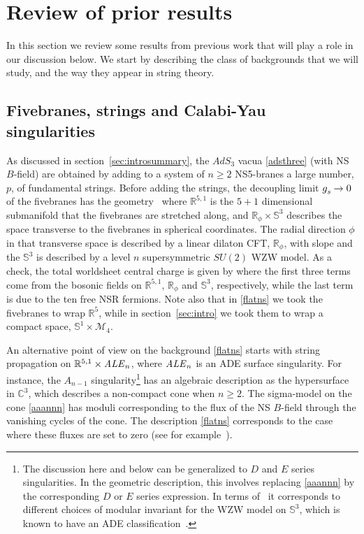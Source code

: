 \documentclass[12pt]{article}
\def\gstr{g_{\textit s}^{\;}}
\def\half{\frac12}
\newcommand{\bC}{{\mathbb C}}
\newcommand{\bR}{{\mathbb R}}
\newcommand{\bS}{{\mathbb S}}
\numberwithin{equation}{section}
\def\cM{\mathcal {M}} \def\cN{\mathcal {N}} \def\cO{\mathcal {O}}
\def\half{\frac12}
\begin{document}
\section{Review of prior results}
\label{sec:review}


In this section we review some results from previous work that will play a role in our discussion below. We start by describing the class of backgrounds that we will study, and the way they appear in string theory. 


\subsection{Fivebranes, strings and Calabi-Yau singularities} 
\label{sec:GKP}

As discussed in section~\ref{sec:introsummary}, the $AdS_3$ vacua \eqref{adsthree} (with NS $B$-field) are obtained by adding to a system of $n\ge 2$ NS5-branes a large number, $p$, of fundamental strings. Before adding the strings, the decoupling limit $\gstr\to 0$ of the fivebranes has the geometry~
\eqn[flatns]{\bR^{5,1}\times \bR_\phi\times \bS^3~,}
where $\bR^{5,1}$ is the $5+1$ dimensional submanifold that the fivebranes are stretched along, and $\bR_\phi\times \bS^3$ describes the space transverse to the fivebranes in spherical coordinates. The radial direction $\phi$ in that transverse space is described by a linear dilaton CFT, $\bR_\phi$, with slope
and the $\bS^3$ is described by a level $n$ supersymmetric $SU(2)$ WZW model. As a check, the total worldsheet central charge is given by 
\eqn[totalcc]{c=6+\left(1+3Q^2\right)+\Big(3-\frac{6}{n}\Big)+10\cdot\half=15~,}
where the first three terms come from the bosonic fields on $\bR^{5,1}$, $\bR_\phi$ and $\bS^3$, respectively, while the last term is due to the ten free NSR fermions.
%
Note also that in \eqref{flatns} we took the fivebranes to wrap $\bR^5$, while in section~\ref{sec:intro} we took them to wrap a compact space, $\bS^1\times \cM_4$.

An alternative point of view on the background \eqref{flatns} starts with string propagation on $\bR^{5,1}\times {\it ALE}_n$, where ${\it ALE}_n$ is an ADE surface singularity.
For instance, the $A_{n-1}$ singularity\footnote{The discussion here and below can be generalized to $D$ and $E$ series singularities. In the geometric description, this involves replacing \eqref{aaannn} by the corresponding $D$ or $E$ series expression. In terms of \flatns\ it corresponds to different choices of modular invariant for the WZW model on $\bS^3$, which is known to have an ADE classification~.}  
has an algebraic description as the hypersurface
in $\bC^3$, which describes a non-compact cone when $n\ge 2$.  The sigma-model on the cone \eqref{aaannn} has moduli corresponding to the flux of the NS $B$-field through the vanishing cycles of the cone. The description \eqref{flatns} corresponds to the case where these fluxes are set to zero
(see for example~).
\end{document}
